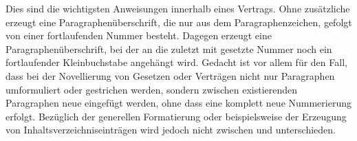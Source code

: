 \begin{Declaration}
  \label{desc:scrjura.contract.macro.Clause}%
  \label{desc:scrjura.contract.macro.SubClause}%
\end{Declaration}
Dies sind die wichtigsten Anweisungen innerhalb eines Vertrags. Ohne
zusätzliche  erzeugt  eine
Paragraphenüberschrift, die nur aus dem Paragraphenzeichen, gefolgt von einer
fortlaufenden Nummer besteht. Dagegen erzeugt  eine
Paragraphenüberschrift, bei der an die zuletzt mit  gesetzte
Nummer noch ein fortlaufender Kleinbuchstabe angehängt wird. Gedacht ist
 vor allem für den Fall, dass bei der Novellierung von
Gesetzen oder Verträgen nicht nur Paragraphen umformuliert oder gestrichen
werden, sondern zwischen existierenden Paragraphen neue eingefügt werden, ohne
dass eine komplett neue Nummerierung erfolgt. Bezüglich der generellen
Formatierung oder beispielsweise der Erzeugung von Inhaltsverzeichniseinträgen
wird jedoch nicht zwischen  und  unterschieden.

